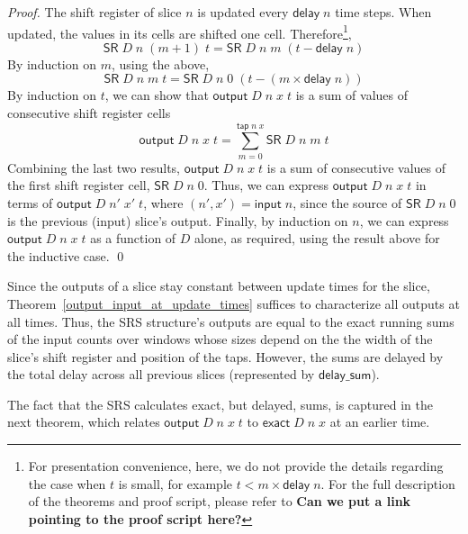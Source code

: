 \documentclass{llncs}
\begin{document}
\begin{proof}
The shift register of slice $n$ is updated every $\mathsf{delay}\;n$ time steps.
When updated, the values in its cells are shifted one cell.
Therefore\footnote{For presentation convenience, here, we do not provide the details regarding the case when $t$ is small, for example $t<m\times\mathsf{delay}\;n$.
For the full description of the theorems and proof script, please refer to {\bf Can we put a link pointing to the proof script here?}},
\begin{equation*}
\mathsf{SR}\;D\;n\;(m+1)\;t=\mathsf{SR}\;D\;n\;m\;(t-\mathsf{delay}\;n)
\end{equation*}
By induction on $m$, using the above,
\begin{equation*}
\mathsf{SR}\;D\;n\;m\;t=\mathsf{SR}\;D\;n\;0\;(t-(m\times\mathsf{delay}\;n))
\end{equation*}
By induction on $t$, we can show that $\mathsf{output}\;D\;n\;x\;t$ is a sum of values of consecutive shift register cells
\begin{equation*}
\mathsf{output}\;D\;n\;x\;t=\sum_{m=0}^{\mathsf{tap}\;n\;x}\mathsf{SR}\;D\;n\;m\;t
\end{equation*}
Combining the last two results, $\mathsf{output}\;D\;n\;x\;t$ is a sum of consecutive values of the first shift register cell, $\mathsf{SR}\;D\;n\;0$.
Thus, we can express $\mathsf{output}\;D\;n\;x\;t$ in terms of $\mathsf{output}\;D\;n'\;x'\;t$, where $(n',x')=\mathsf{input}\;n$, since the source of $\mathsf{SR}\;D\;n\;0$ is the previous (input) slice's output.
Finally, by induction on $n$, we can express $\mathsf{output}\;D\;n\;x\;t$ as a function of $D$ alone, as required, using the result above for the inductive case.
\qed
\end{proof}

Since the outputs of a slice stay constant between update times for the slice, Theorem~\ref{output_input_at_update_times} suffices to characterize all outputs at all times.
Thus, the SRS structure's outputs are equal to the exact running sums of the input counts over windows whose sizes depend on the the width of the slice's shift register and position of the taps.
However, the sums are delayed by the total delay across all previous slices (represented by $\mathsf{delay\_sum}$).

The fact that the SRS calculates exact, but delayed, sums, is captured in the next theorem, which relates $\mathsf{output}\;D\;n\;x\;t$ to $\mathsf{exact}\;D\;n\;x$ at an earlier time.
\end{document}
